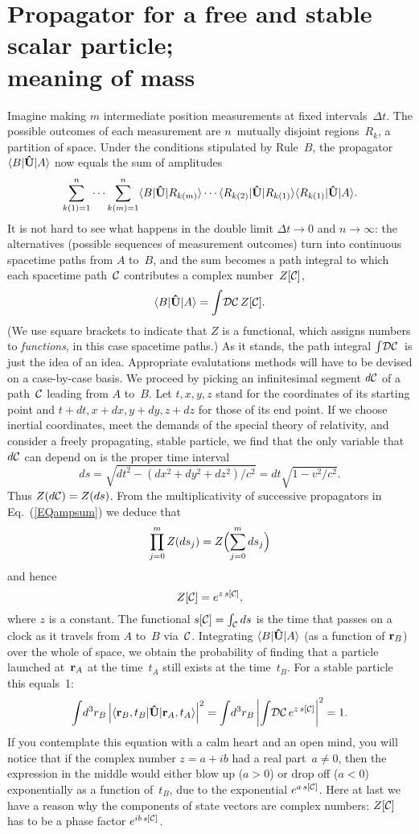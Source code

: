 \documentclass[12pt]{article}
\newcommand{\sandwich}[3]{\langle#1\vert#2\vert#3\rangle}
\newcommand{\DC}{\!{\cal DC}\,}
\newcommand{\be}{\begin{equation}}
\newcommand{\ee}{\end{equation}}
\newcommand{\br}{{\bf r}}
\newcommand{\cC}{{\cal C}}
\newcommand{\hU}{{\bf\hat U}}
\begin{document}
\section{Propagator for a free and stable scalar particle;\\
meaning of mass}
Imagine making $m$ intermediate position measurements at fixed intervals~$\Delta t$. The possible outcomes of each measurement are $n$~mutually disjoint regions~$R_k$, a partition of space. Under the conditions stipulated by Rule~$B$, the propagator $\sandwich B\hU A$ now equals the sum of amplitudes
\be
\sum_{k(1)=1}^n\cdots\sum_{k(m)=1}^n
\sandwich B\hU {R_{k(m)}}\cdots\sandwich{R_{k(2)}}\hU{R_{k(1)}}\sandwich{R_{k(1)}}\hU A.
\label{EQampsum}
\ee
It is not hard to see what happens in the double limit $\Delta t\rightarrow 0$ and $n\rightarrow\infty$: the alternatives (possible sequences of measurement outcomes) turn into continuous spacetime paths from $A$ to~$B$, and the sum becomes a path integral to which each spacetime path~$\cC$ contributes a complex number~$Z[\cC]$,
\be
\sandwich B\hU A=\int\DC Z[\cC].
\label{EQpathint}
\ee
(We use square brackets to indicate that $Z$ is a functional, which assigns numbers to \textit{functions}, in this case spacetime paths.) As it stands, the path integral $\int\DC$ is just the idea of an idea. Appropriate evalutations methods will have to be devised on a case-by-case basis. We proceed by picking an infinitesimal segment $d\cC$ of a path~$\cC$ leading from $A$ to~$B$. Let $t,x,y,z$ stand for the coordinates of its starting point and $t+dt,x+dx,y+dy,z+dz$ for those of its end point. If we choose inertial coordinates, meet the demands of the special theory of relativity, and consider a freely propagating, stable particle, we find that the only variable that $d\cC$ can depend on is the proper time interval
\be
ds=\sqrt{dt^2-(dx^2+dy^2+dz^2)/c^2}=dt\sqrt{1-v^2/c^2}.
\ee
Thus $Z(d\cC)=Z(ds)$. From the multiplicativity of successive propagators in Eq.~(\ref{EQampsum}) we deduce that
\be
\prod_{j=0}^m Z(ds_j)=Z\Bigl(\sum_{j=0}^m ds_j\Bigr)
\ee
and hence
\be
Z[\cC]=e^{z\,s[\cC]},
\ee
where $z$ is a constant. The functional $s[\cC]=\int_\cC ds$ is the time that passes on a clock as it travels from $A$ to~$B$ via~$\cC$. Integrating $\sandwich B\hU A$ (as a function of $\br_B$) over the whole of space, we obtain the probability of finding that a particle launched at~$\br_A$ at the time~$t_A$ still exists at the time~$t_B$. For a stable particle this equals~1:
\be
\int\!d^3r_B\,\Bigl|\sandwich{\br_B,t_B}\hU{\br_A,t_A}\Bigr|^2=
\int\!d^3r_B\left|\int\DC e^{z\,s[\cC]}\right|^2=1.
\label{qmch}
\ee
If you contemplate this equation with a calm heart and an open mind, you will notice that if the complex number $z=a+ib$ had a real part~$a\neq0$, then the expression in the middle would either blow up ($a>0$) or drop off ($a<0$) exponentially as a function of~$t_B$, due to the exponential $e^{a\,s[\cC]}$. Here at last we have a reason why the components of state vectors are complex numbers: $Z[\cC]$ has to be a phase factor $e^{ib\,s[\cC]}$.
\end{document}
